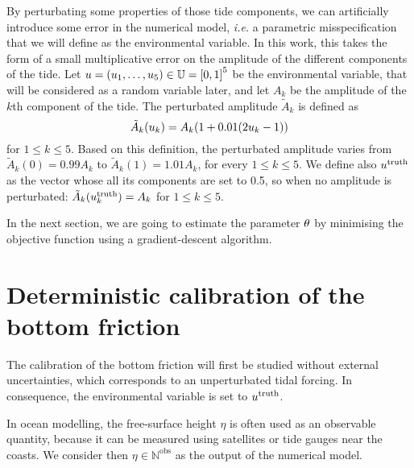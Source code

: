 \documentclass[../../Main_ManuscritThese.tex]{subfiles}
\begin{document}
By perturbating some properties of those tide components, we can
artificially introduce some error in the numerical model, \emph{i.e.}
a parametric misspecification that we will define as the environmental
variable. In this work, this takes the form of a small multiplicative
error on the amplitude of the different components of the tide. Let
$\uu = (\uu_1,\dots,\uu_5)\in \Uspace = \interval{0}{1}^5$ be the
environmental variable, that will be considered as a random variable
later, and let $A_k$ be the amplitude of the $k$th component of the
tide.  The perturbated amplitude $\tilde{A}_k$ is defined as
\begin{equation}
  \label{eq:tide_error}
  \tilde{A}_k(u_k) = A_k (1 + 0.01(2u_k - 1))
\end{equation}
for $1\leq k\leq 5$.
Based on this definition, the perturbated amplitude varies from
$\tilde{A}_k(0) = 0.99A_k$ to $\tilde{A}_k(1) = 1.01A_k$, for every
$1\leq k \leq 5$. We define also $u^{\mathrm{truth}}$ as
the vector whose all its components are set to \num{0.5}, so when no
amplitude is perturbated: $\tilde{A}_k(u_k^{\mathrm{truth}}) = A_k$
for $1\leq k \leq 5$.


In the next section, we are going to estimate the parameter $\theta$ by
minimising the objective function using a gradient-descent algorithm.
\section{Deterministic calibration of the bottom friction}
\label{sec:deterministic_calibration_bott}
The calibration of the bottom friction will first be studied without
external uncertainties, which corresponds to an unperturbated tidal
forcing. In consequence, the environmental variable is set to
$u^{\mathrm{truth}}$.

In ocean modelling, the free-surface height $\eta$ is often used as an
observable quantity, because it can be measured using satellites or
tide gauges near the coasts. We consider then
$\eta\in \mathbb{N}^{\mathrm{obs}}$ as the output of the numerical
model.
\end{document}
